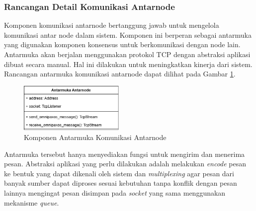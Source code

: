 \subsubsection{Rancangan Detail Komunikasi Antarnode}
\label{subsubsection:detail-komponen-internode-interface}

Komponen komunikasi antarnode bertanggung jawab untuk mengelola komunikasi antar node dalam sistem. Komponen ini berperan sebagai antarmuka yang digunakan komponen konsensus untuk berkomunikasi dengan node lain. Antarmuka akan berjalan menggunakan protokol TCP dengan abstraksi aplikasi dibuat secara manual. Hal ini dilakukan untuk meningkatkan kinerja dari sistem. Rancangan antarmuka komunikasi antarnode dapat dilihat pada Gambar \ref{fig:internode-interface-component}.

\begin{figure}[ht]
	\centering
	\includegraphics[width=0.45\textwidth]{resources/chapter-3/internode-interface-component.png}
	\caption{Komponen Antarmuka Komunikasi Antarnode}
	\label{fig:internode-interface-component}
\end{figure}

Antarmuka tersebut hanya menyediakan fungsi untuk mengirim dan menerima pesan. Abstraksi aplikasi yang perlu dilakukan adalah melakukan \textit{encode} pesan ke bentuk yang dapat dikenali oleh sistem dan \textit{multiplexing} agar pesan dari banyak sumber dapat diproses sesuai kebutuhan tanpa konflik dengan pesan lainnya mengingat pesan disimpan pada \textit{socket} yang sama menggunakan mekanisme \textit{queue}.